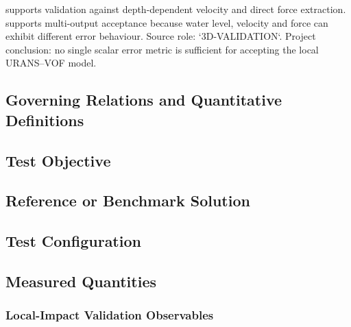 \textcite{qin2018comparison} supports validation against
depth-dependent velocity and direct force extraction. \textcite{watanabe2022validation}
supports multi-output acceptance because water level, velocity and
force can exhibit different error behaviour. Source role:
`3D-VALIDATION`. Project conclusion: no single scalar error metric is
sufficient for accepting the local URANS--VOF model.

\subsection{Governing Relations and Quantitative Definitions}
\label{sec:res-ver-met-governing-relations}

%

\subsection{Test Objective}
\label{sec:res-ver-met-test-objective}


\subsection{Reference or Benchmark Solution}
\label{sec:res-ver-met-reference-benchmark-solution}


\subsection{Test Configuration}
\label{sec:res-ver-met-test-configuration}


\subsection{Measured Quantities}
\label{sec:res-ver-met-measured-quantities}


\subsubsection{Local-Impact Validation Observables}
\label{sec:res-ver-met-local-validation-observables}

